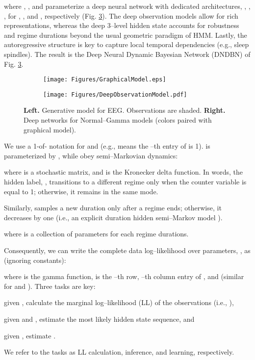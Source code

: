 \documentclass[runningheads]{llncs}
\begin{document}
where \theta, \theta, and \theta parameterize a deep neural network with dedicated architectures, \theta, \theta, \theta, for , , and , respectively (Fig. \ref{fig:DNDBN}). The deep observation models allow for rich representations, whereas the deep 3--level hidden state accounts for robustness and regime durations beyond the usual geometric paradigm of HMM. Lastly, the autoregressive structure is key to capture local temporal dependencies (e.g.,  sleep spindles). The result is the Deep Neural Dynamic Bayesian Network (DNDBN) of Fig. \ref{fig:DNDBN}.
\begin{figure}[tb]
	\centering
	\begin{subfigure}[t]{0.4793\linewidth}
\texttt{[image: Figures/GraphicalModel.eps]}
		\label{fig:GraphicalModel}
	\end{subfigure}
	\begin{subfigure}[t]{0.4793\linewidth}
\texttt{[image: Figures/DeepObservationModel.pdf]}
		\label{fig:DeepObservationModels}
	\end{subfigure}
	\caption{\textbf{Left.} Generative model for EEG. Observations are shaded. \textbf{Right.} Deep networks for Normal--Gamma models (colors paired with graphical model).}
	\label{fig:DNDBN}
\end{figure}


We use a 1-of- notation for  and  (e.g.,  means the --th entry of  is 1).  is parameterized by \boldmath\unboldmath, while  obey semi--Markovian dynamics:

where  is a  stochastic matrix, and  is the Kronecker delta function. In words, the hidden label, , transitions to a different regime only when the counter variable is equal to 1; otherwise, it remains in the same mode. 

Similarly,  samples a new duration only after a regime ends; otherwise, it decreases by one (i.e., an explicit duration hidden semi--Markov model \cite{ferguson1980variable,yu2010hidden}).

where \lambda is a collection of parameters for each regime durations.


Consequently, we can write the complete data log--likelihood over parameters, \theta\boldmath\unboldmath\boldmath\unboldmath\theta\theta\theta, as (ignoring constants):


where  is the gamma function,  is the --th row, --th column entry of , and  (similar for  and \boldmath\unboldmath). Three tasks are key: \begin{enumerate*}[label=\alph*)] 
	\item given \theta, calculate the marginal log--likelihood (LL) of the observations (i.e., \theta), \item given  and \theta, estimate the most likely hidden state sequence, and 
	\item given , estimate \theta.
	\end{enumerate*} We refer to the tasks as LL calculation, inference, and learning, respectively. 
\end{document}
